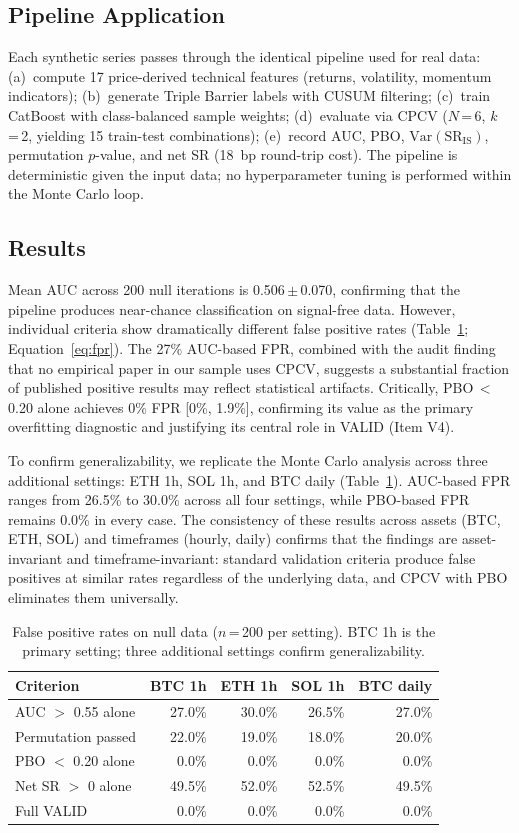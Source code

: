 \documentclass[preprint,12pt,authoryear]{elsarticle}
\begin{document}
\subsection{Pipeline Application}
Each synthetic series passes through the identical pipeline used for real data: (a)~compute 17 price-derived technical features (returns, volatility, momentum indicators); (b)~generate Triple Barrier labels with CUSUM filtering; (c)~train CatBoost with class-balanced sample weights; (d)~evaluate via CPCV ($N$\,=\,6, $k$\,=\,2, yielding 15 train-test combinations); (e)~record AUC, PBO, $\mathrm{Var}(\mathrm{SR}_{\mathrm{IS}})$, permutation $p$-value, and net SR (18~bp round-trip cost). The pipeline is deterministic given the input data; no hyperparameter tuning is performed within the Monte Carlo loop.

\subsection{Results}
Mean AUC across 200 null iterations is 0.506\,$\pm$\,0.070, confirming that the pipeline produces near-chance classification on signal-free data. However, individual criteria show dramatically different false positive rates (Table~\ref{tab:fpr}; Equation~\ref{eq:fpr}). The 27\% AUC-based FPR, combined with the audit finding that no empirical paper in our sample uses CPCV, suggests a substantial fraction of published positive results may reflect statistical artifacts. Critically, PBO\,$<$\,0.20 alone achieves 0\% FPR [0\%, 1.9\%], confirming its value as the primary overfitting diagnostic and justifying its central role in VALID (Item V4).

To confirm generalizability, we replicate the Monte Carlo analysis across three additional settings: ETH 1h, SOL 1h, and BTC daily (Table~\ref{tab:fpr}). AUC-based FPR ranges from 26.5\% to 30.0\% across all four settings, while PBO-based FPR remains 0.0\% in every case. The consistency of these results across assets (BTC, ETH, SOL) and timeframes (hourly, daily) confirms that the findings are asset-invariant and timeframe-invariant: standard validation criteria produce false positives at similar rates regardless of the underlying data, and CPCV with PBO eliminates them universally.

\begin{table}[htbp]
\centering
\caption{False positive rates on null data ($n$\,=\,200 per setting). BTC 1h is the primary setting; three additional settings confirm generalizability.}
\label{tab:fpr}
\small
\begin{tabular}{lrrrr}
\toprule
Criterion & BTC 1h & ETH 1h & SOL 1h & BTC daily \\
\midrule
AUC $>$ 0.55 alone & 27.0\% & 30.0\% & 26.5\% & 27.0\% \\
Permutation passed & 22.0\% & 19.0\% & 18.0\% & 20.0\% \\
PBO $<$ 0.20 alone & 0.0\% & 0.0\% & 0.0\% & 0.0\% \\
Net SR $>$ 0 alone & 49.5\% & 52.0\% & 52.5\% & 49.5\% \\
Full VALID & 0.0\% & 0.0\% & 0.0\% & 0.0\% \\
\bottomrule
\end{tabular}
\end{table}
\end{document}
